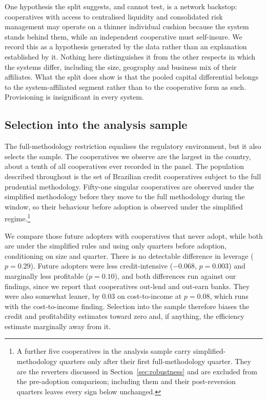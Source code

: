 \documentclass[11pt,a4paper]{article}
\begin{document}
One hypothesis the split suggests, and cannot test, is a network backstop: cooperatives
with access to centralised liquidity and consolidated risk management may operate on a
thinner individual cushion because the system stands behind them, while an independent
cooperative must self-insure. We record this as a hypothesis generated by the data rather
than an explanation established by it. Nothing here distinguishes it from the other
respects in which the systems differ, including the size, geography and business mix of
their affiliates. What the split does show is that the pooled capital differential
belongs to the system-affiliated segment rather than to the cooperative form as such.
Provisioning is insignificant in every system.

\subsection{Selection into the analysis sample}
\label{sec:selection}

The full-methodology restriction equalises the regulatory environment, but it also
selects the sample. The cooperatives we observe are the largest in the country, about a
tenth of all cooperatives ever recorded in the panel. The population described throughout
is the set of Brazilian credit cooperatives subject to the full prudential methodology.
Fifty-one singular cooperatives are observed under the simplified methodology before they
move to the full methodology during the window, so their behaviour before adoption is
observed under the simplified regime.\footnote{A further five cooperatives in the
analysis sample carry simplified-methodology quarters only after their first
full-methodology quarter. They are the reverters discussed in
Section~\ref{sec:robustness} and are excluded from the pre-adoption comparison; including
them and their post-reversion quarters leaves every sign below unchanged.}

We compare those future adopters with cooperatives that never adopt, while both are under
the simplified rules and using only quarters before adoption, conditioning on size and
quarter. There is no detectable difference in leverage ($p=0.29$). Future adopters were
less credit-intensive ($-0.068$, $p=0.003$) and marginally less profitable ($p=0.10$),
and both differences run against our findings, since we report that cooperatives
out-lend and out-earn banks. They were also somewhat leaner, by 0.03 on cost-to-income at
$p=0.08$, which runs with the cost-to-income finding. Selection into the sample therefore
biases the credit and profitability estimates toward zero and, if anything, the
efficiency estimate marginally away from it.
\end{document}
